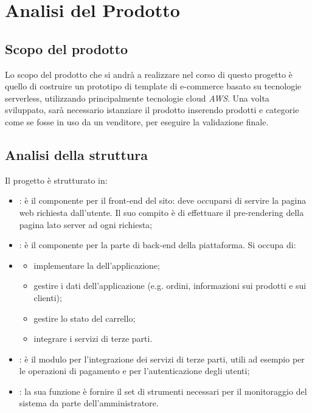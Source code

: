 \section{Analisi del Prodotto}
\subsection{Scopo del prodotto}
Lo scopo del prodotto che si andrà a realizzare nel corso di questo progetto è quello di costruire un prototipo di
template di e-commerce basato su tecnologie serverless, utilizzando principalmente tecnologie cloud \textit{AWS}.
Una volta sviluppato, sarà necessario istanziare il prodotto inserendo prodotti e categorie come se fosse in uso
da un venditore, per eseguire la validazione finale.

\subsection{Analisi della struttura}
Il progetto \textit{} è strutturato in:
\begin{itemize}
    \item \textbf{}: è il componente per il front-end del sito: deve occuparsi di servire la pagina web richiesta dall'utente. Il suo compito è di effettuare il pre-rendering della pagina lato server ad ogni richiesta;
	\item \textbf{}: è il componente per la parte di back-end della piattaforma. Si occupa di:
	\item \begin{itemize}
        \item implementare la \textit{} dell'applicazione;
        \item gestire i dati dell'applicazione (e.g. ordini, informazioni sui prodotti e sui clienti);
        \item gestire lo stato del carrello;
        \item integrare i servizi di terze parti.
    \end{itemize}
	\item \textbf{}: è il modulo per l'integrazione dei servizi di terze parti, utili ad esempio per le operazioni di pagamento e per l'autenticazione degli utenti;
	\item \textbf{}: la sua funzione è fornire il set di strumenti necessari per il monitoraggio del sistema da parte dell'amministratore.
\end{itemize}

